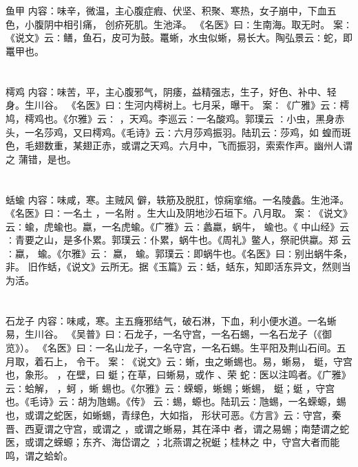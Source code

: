 \documentclass[12pt,UTF8]{ctexbook}
\begin{document}
\section{}鱼甲
内容：味辛，微温，主心腹症瘕、伏坚、积聚、寒热，女子崩中，下血五色，小腹阴中相引痛， 
创疥死肌。生池泽。 
《名医》曰∶生南海。取无时。 
案∶《说文》云∶鳝，鱼石，皮可为鼓。鼍蜥，水虫似蜥，易长大。陶弘景云∶蛇，即 
鼍甲也。 


\section{}樗鸡
内容：味苦，平，主心腹邪气，阴痿，益精强志，生子，好色、补中、轻身。生川谷。 
《名医》曰∶生河内樗树上。七月采，曝干。 
案∶《广雅》云∶樗鸠，樗鸡也。《尔雅》云∶ ，天鸡。李巡云∶一名酸鸡。郭璞云 
∶小虫，黑身赤头，一名莎鸡，又曰樗鸡。《毛诗》云∶六月莎鸡振羽。陆玑云∶莎鸡，如 
蝗而斑色，毛翅数重，某翅正赤，或谓之天鸡。六月中，飞而振羽，索索作声。幽州人谓之 
蒲错，是也。 


\section{}蛞蝓
内容：味咸，寒。主贼风 僻，轶筋及脱肛，惊痫挛缩。一名陵蠡。生池泽。 
《名医》曰∶一名土 ，一名附 。生大山及阴地沙石垣下。八月取。 
案∶《说文》云∶蝓，虎蝓也。蠃，一名虎蝓。《广雅》云∶蠡蠃，蜗牛， 蝓也。《 
中山经》云∶青要之山，是多仆累。郭璞云∶仆累，蜗牛也。《周礼》鳖人，祭祀供蠃。郑 
云∶蠃， 蝓。《尔雅》云∶ 蠃， 蝓。郭璞云∶即蜗牛也。《名医》曰∶别出蜗牛条，非。 
旧作蛞，《说文》云所无。据《玉篇》云∶蛞，蛞东，知即活东异文，然则当为活。 


\section{}石龙子
内容：味咸，寒。主五癃邪结气，破石淋，下血，利小便水道。一名蜥易，生川谷。 
《吴普》曰∶石龙子，一名守宫，一名石蜴，一名石龙子（《御览》）。 
《名医》曰∶一名山龙子，一名守宫，一名石蜴。生平阳及荆山石间。五月取，着石上， 
令干。 
案∶《说文》云∶蜥，虫之蜥蜴也。易，蜥易， 蜓，守宫也，象形。 ，在壁，曰 
蜓；在草，曰蜥易，或作 、荣 蛇∶医以注鸣者。《广雅》云∶蛤解， ，蚵 ，蜥 
蜴也。《尔雅》云∶蝾螈，蜥蜴；蜥蜴， 蜓；蜓 ，守宫也。《毛诗》云∶胡为虺蜴。《传》 
云∶蜴，螈也。陆玑云∶虺蜴，一名蝾螈，蜴也，或谓之蛇医，如蜥蜴，青绿色，大如指， 
形状可恶。《方言》云∶守宫，秦晋、西夏谓之守宫，或谓之 ，或谓之蜥易，其在泽中 
者，谓之易蜴；南楚谓之蛇医，或谓之蝾螈；东齐、海岱谓之 ；北燕谓之祝蜓；桂林之 
中，守宫大者而能鸣，谓之蛤蚧。 
\end{document}
